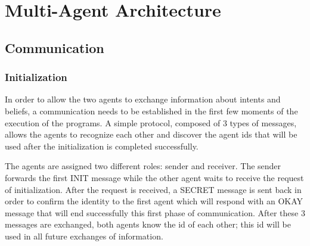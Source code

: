 \documentclass[a4paper, 11pt]{article}
\begin{document}
\pagebreak

\section{Multi-Agent Architecture}


\subsection{Communication}
\subsubsection{Initialization}
In order to allow the two agents to exchange information about intents and beliefs, a communication needs to be established in the first few moments of the execution of the programs. A simple protocol, composed of 3 types of messages, allows the agents to recognize each other and discover the agent ids that will be used after the initialization is completed successfully.

The agents are assigned two different roles: sender and receiver. The sender forwards the first INIT message while the other agent waits to receive the request of initialization. After the request is received, a SECRET message is sent back in order to confirm the identity to the first agent which will respond with an OKAY message that will end successfully this first phase of communication. After these 3 messages are exchanged, both agents know the id of each other; this id will be used in all future exchanges of information.
\end{document}
